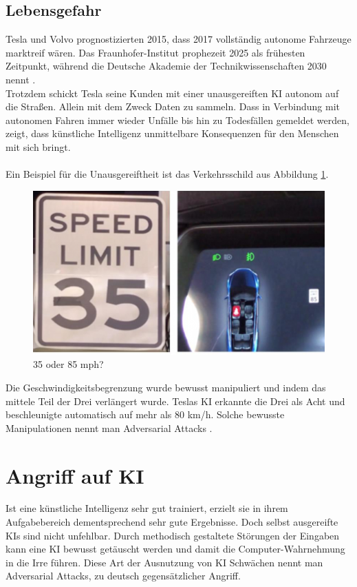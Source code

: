 \documentclass[12pt,oneside,a4paper,parskip]{scrbook}
\begin{document}
\subsection{Lebensgefahr}
Tesla und Volvo prognostizierten 2015, dass 2017 vollständig autonome Fahrzeuge marktreif wären. Das Fraunhofer-Institut prophezeit 2025 als frühesten Zeitpunkt, während die Deutsche Akademie der Technikwissenschaften 2030 nennt \cite{AutonomAuto}.
\\Trotzdem schickt Tesla seine Kunden mit einer unausgereiften KI autonom auf die Straßen. Allein mit dem Zweck Daten zu sammeln. Dass in Verbindung mit autonomen Fahren immer wieder Unfälle bis hin zu Todesfällen gemeldet werden, zeigt, dass künstliche Intelligenz unmittelbare Konsequenzen für den Menschen mit sich bringt. \\\\
Ein Beispiel für die Unausgereiftheit ist das Verkehrsschild aus Abbildung \ref{fig:Verkehrsschild}.  %
\begin{figure}[h]
	\begin{center}
		\includegraphics[width=15cm]{Bilder/Tesla_Adversarial_Attack.png}
		\caption{35 oder 85 mph?\cite{teslaCarImage}}
		\label{fig:Verkehrsschild}
	\end{center}
\end{figure}
Die Geschwindigkeitsbegrenzung wurde bewusst manipuliert und indem das mittele Teil der Drei verlängert wurde. Teslas KI erkannte die Drei als Acht und beschleunigte automatisch auf mehr als 80 km/h. Solche bewusste Manipulationen nennt man Adversarial Attacks \cite{TeslaHack}.
\section{Angriff auf KI}
Ist eine künstliche Intelligenz sehr gut trainiert, erzielt sie in ihrem Aufgabebereich dementsprechend sehr gute Ergebnisse. Doch selbst ausgereifte KIs sind nicht unfehlbar. Durch methodisch gestaltete Störungen der Eingaben kann eine KI bewusst getäuscht werden und damit die Computer-Wahrnehmung in die Irre führen. Diese Art der Ausnutzung von KI Schwächen nennt man Adversarial Attacks, zu deutsch gegensätzlicher Angriff.
\end{document}
